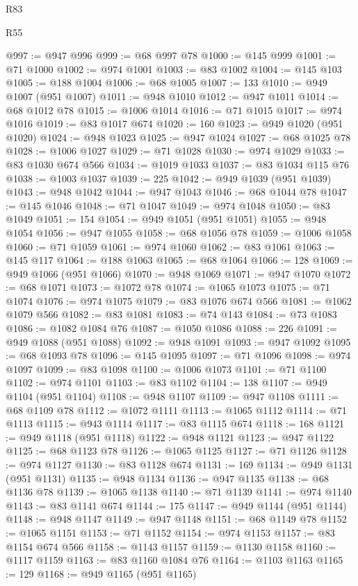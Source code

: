 \begin{lexlean}{R83}
\begin{lexlean}{R55}
\begin{coremodule}
{{{{{{{{{{{{{{{{{{{{{{{{{{{{{{{{{{{{{{{{{{{{{{{{{{{{{{{{{{{{{{@997 := @947 @996
@999 := @68 @997 @78
@1000 := @145 @999
@1001 := @71 @1000
@1002 := @974 @1001
@1003 := @83 @1002
@1004 := @145 @103
@1005 := @188 @1004
@1006 := @68 @1005
@1007 := 133
@1010 := @949 @1007 (@951 @1007)
@1011 := @948 @1010
@1012 := @947 @1011
@1014 := @68 @1012 @78
@1015 := @1006 @1014
@1016 := @71 @1015
@1017 := @974 @1016
@1019 := @83 @1017 @674
@1020 := 160
@1023 := @949 @1020 (@951 @1020)
@1024 := @948 @1023
@1025 := @947 @1024
@1027 := @68 @1025 @78
@1028 := @1006 @1027
@1029 := @71 @1028
@1030 := @974 @1029
@1033 := @83 @1030 @674 @566
@1034 := @1019 @1033
@1037 := @83 @1034 @115 @76
@1038 := @1003 @1037
@1039 := 225
@1042 := @949 @1039 (@951 @1039)
@1043 := @948 @1042
@1044 := @947 @1043
@1046 := @68 @1044 @78
@1047 := @145 @1046
@1048 := @71 @1047
@1049 := @974 @1048
@1050 := @83 @1049
@1051 := 154
@1054 := @949 @1051 (@951 @1051)
@1055 := @948 @1054
@1056 := @947 @1055
@1058 := @68 @1056 @78
@1059 := @1006 @1058
@1060 := @71 @1059
@1061 := @974 @1060
@1062 := @83 @1061
@1063 := @145 @117
@1064 := @188 @1063
@1065 := @68 @1064
@1066 := 128
@1069 := @949 @1066 (@951 @1066)
@1070 := @948 @1069
@1071 := @947 @1070
@1072 := @68 @1071
@1073 := @1072 @78
@1074 := @1065 @1073
@1075 := @71 @1074
@1076 := @974 @1075
@1079 := @83 @1076 @674 @566
@1081 := @1062 @1079 @566
@1082 := @83 @1081
@1083 := @74 @143
@1084 := @73 @1083
@1086 := @1082 @1084 @76
@1087 := @1050 @1086
@1088 := 226
@1091 := @949 @1088 (@951 @1088)
@1092 := @948 @1091
@1093 := @947 @1092
@1095 := @68 @1093 @78
@1096 := @145 @1095
@1097 := @71 @1096
@1098 := @974 @1097
@1099 := @83 @1098
@1100 := @1006 @1073
@1101 := @71 @1100
@1102 := @974 @1101
@1103 := @83 @1102
@1104 := 138
@1107 := @949 @1104 (@951 @1104)
@1108 := @948 @1107
@1109 := @947 @1108
@1111 := @68 @1109 @78
@1112 := @1072 @1111
@1113 := @1065 @1112
@1114 := @71 @1113
@1115 := @943 @1114
@1117 := @83 @1115 @674
@1118 := 168
@1121 := @949 @1118 (@951 @1118)
@1122 := @948 @1121
@1123 := @947 @1122
@1125 := @68 @1123 @78
@1126 := @1065 @1125
@1127 := @71 @1126
@1128 := @974 @1127
@1130 := @83 @1128 @674
@1131 := 169
@1134 := @949 @1131 (@951 @1131)
@1135 := @948 @1134
@1136 := @947 @1135
@1138 := @68 @1136 @78
@1139 := @1065 @1138
@1140 := @71 @1139
@1141 := @974 @1140
@1143 := @83 @1141 @674
@1144 := 175
@1147 := @949 @1144 (@951 @1144)
@1148 := @948 @1147
@1149 := @947 @1148
@1151 := @68 @1149 @78
@1152 := @1065 @1151
@1153 := @71 @1152
@1154 := @974 @1153
@1157 := @83 @1154 @674 @566
@1158 := @1143 @1157
@1159 := @1130 @1158
@1160 := @1117 @1159
@1163 := @83 @1160 @1084 @76
@1164 := @1103 @1163
@1165 := 129
@1168 := @949 @1165 (@951 @1165)
}}}}}}}}}}}}}}}}}}}}}}}}}}}}}}}}}}}}}}}}}}}}}}}}}}}}}}}}}}}}}}
\end{coremodule}
\end{lexlean}
\end{lexlean}
